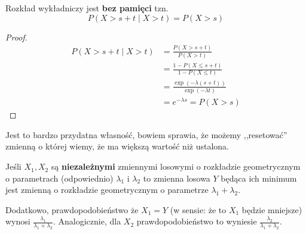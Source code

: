 \begin{theorem}[Lemat 8.4 P\&C]
	Rozkład wykładniczy jest \textbf{bez pamięci} tzn.
	\[
		P(X > s + t \mid X > t) = P(X > s)
	\]
\end{theorem}
\begin{proof}
	\begin{align*}
		P(X > s + t \mid X > t) & = \frac{P(X > s + t)}{P(X > t)}                  \\
		                        & = \frac{1 - P(X \leq s + t)}{1 - P(X \leq t)}    \\
		                        & = \frac{\exp(-\lambda(s + t))}{\exp(-\lambda t)} \\
		                        & = e^{-\lambda s} = P(X > s)
	\end{align*}
\end{proof}

Jest to bardzo przydatna własność, bowiem sprawia, że możemy ,,resetować'' zmienną o której wiemy, że ma większą wartość niż ustalona.

\begin{theorem}[Lemat 8.5 P\&C]
	\label{lemat8.5}
	Jeśli \(X_1, X_2\) są \textbf{niezależnymi} zmiennymi losowymi o rozkładzie geometrycznym o parametrach (odpowiednio) \(\lambda_1\) i \(\lambda_2\) to zmienna losowa \(Y\) będąca ich minimum jest zmienną o rozkładzie geometrycznym o parametrze \( \lambda_1 + \lambda_2 \).

	Dodatkowo, prawdopodobieństwo że \(X_1 = Y\) (w sensie: że to \(X_1\) będzie mniejsze) wynosi \( \frac{\lambda_1}{\lambda_1 + \lambda_2} \). Analogicznie, dla \(X_2\) prawdopodobieństwo to wyniesie \( \frac{\lambda_2}{\lambda_1 + \lambda_2} \).
\end{theorem}

